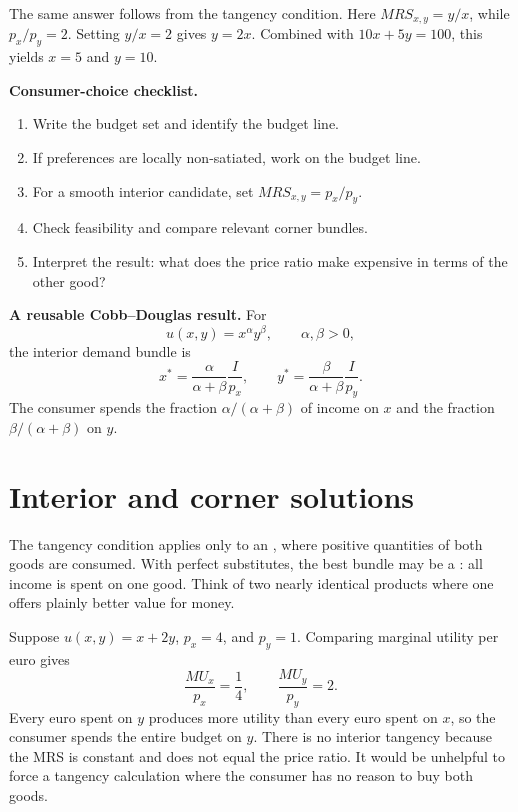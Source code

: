 The same answer follows from the tangency condition. Here $MRS_{x,y}=y/x$, while $p_x/p_y=2$. Setting $y/x=2$ gives $y=2x$. Combined with $10x+5y=100$, this yields $x=5$ and $y=10$.

\begin{keyidea}
\textbf{Consumer-choice checklist.}
\begin{enumerate}
  \item Write the budget set and identify the budget line.
  \item If preferences are locally non-satiated, work on the budget line.
  \item For a smooth interior candidate, set $MRS_{x,y}=p_x/p_y$.
  \item Check feasibility and compare relevant corner bundles.
  \item Interpret the result: what does the price ratio make expensive in terms of the other good?
\end{enumerate}
\end{keyidea}

\medskip
\noindent\textbf{A reusable Cobb--Douglas result.} For
\[
u(x,y)=x^\alpha y^\beta,
\qquad \alpha,\beta>0,
\]
the interior demand bundle is
\[
x^*=\frac{\alpha}{\alpha+\beta}\frac{I}{p_x},
\qquad
y^*=\frac{\beta}{\alpha+\beta}\frac{I}{p_y}.
\]
The consumer spends the fraction $\alpha/(\alpha+\beta)$ of income on $x$ and
the fraction $\beta/(\alpha+\beta)$ on $y$.

\section{Interior and corner solutions}

The tangency condition applies only to an , where
positive quantities of both goods are consumed. With perfect substitutes, the
best bundle may be a : all income is spent on one
good. Think of two nearly identical products where one offers plainly better
value for money.

Suppose $u(x,y)=x+2y$, $p_x=4$, and $p_y=1$. Comparing marginal utility
per euro gives
\[
\frac{MU_x}{p_x}=\frac{1}{4},
\qquad
\frac{MU_y}{p_y}=2.
\]
Every euro spent on $y$ produces more utility than every euro spent on $x$,
so the consumer spends the entire budget on $y$. There is no interior tangency
because the MRS is constant and does not equal the price ratio. It would be
unhelpful to force a tangency calculation where the consumer has no reason to
buy both goods.

